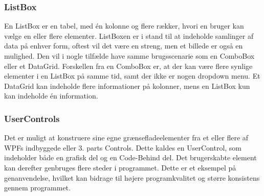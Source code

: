 \subsubsection*{ListBox}
En ListBox er en tabel, med én kolonne og flere rækker, hvori en bruger kan vælge en eller flere elementer.
ListBoxen er i stand til at indeholde samlinger af data på enhver form, oftest vil det være en streng, men et billede er også en mulighed.
Den vil i nogle tilfælde have samme brugsscenarie som en ComboBox eller et DataGrid. 
Forskellen fra en ComboBox er, at der kan være flere synlige elementer i en ListBox på samme tid, samt der ikke er nogen dropdown menu.
Et DataGrid kan indeholde flere informationer på kolonner, mens en ListBox kun kan indeholde én information.

\subsubsection*{UserControls}
Det er muligt at konstruere sine egne grænsefladeelementer fra et eller flere af WPFs indbyggede eller 3. parts Controls.
Dette kaldes en UserControl, som indeholder både en grafisk del og en Code-Behind del.
Det brugerskabte element kan derefter genbruges flere steder i programmet.
Dette er et eksempel på genanvendelse, hvilket kan bidrage til højere programkvalitet og større konsistens gennem programmet. 
